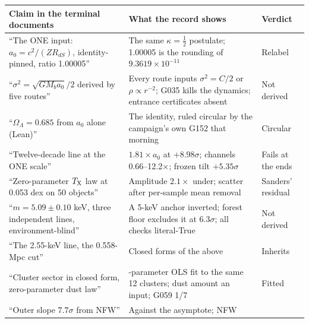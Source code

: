 \documentclass[
  11pt,
]{article}
\newcounter{none} %
\begin{document}
{\def\LTcaptype{none} %
\begin{longtable}[]{@{}
  >{\raggedright\arraybackslash}p{}
  >{\raggedright\arraybackslash}p{}
  >{\raggedright\arraybackslash}p{}@{}}
\toprule\noalign{}
\begin{minipage}[b]{\linewidth}\raggedright
Claim in the terminal documents
\end{minipage} & \begin{minipage}[b]{\linewidth}\raggedright
What the record shows
\end{minipage} & \begin{minipage}[b]{\linewidth}\raggedright
Verdict
\end{minipage} \\
\midrule\noalign{}
\endhead
\bottomrule\noalign{}
\endlastfoot
``The ONE input: \(a_0 = c^2/(Z R_{dS})\), identity-pinned, ratio
1.00005'' & The same \(\kappa = \tfrac12\) postulate; 1.00005 is the
rounding of \(9.3619\times10^{-11}\) & Relabel \\
``\(\sigma^2 = \sqrt{G M_b a_0}/2\) derived by five routes'' & Every
route inputs \(\sigma^2 = C/2\) or \(\rho \propto r^{-2}\); G035 kills
the dynamics; entrance certificates absent & Not derived \\
``\(\Omega_\Lambda = 0.685\) from \(a_0\) alone (Lean)'' & The identity,
ruled circular by the campaign's own G152 that morning & Circular \\
``Twelve-decade line at the ONE scale'' & \(1.81\times a_0\) at
\(+8.98\sigma\); channels 0.66--12.2\(\times\); frozen tilt
\(+5.35\sigma\) & Fails at the ends \\
``Zero-parameter \(T_{\rm X}\) law at 0.053 dex on 50 objects'' &
Amplitude \(2.1\times\) under; scatter after per-sample mean removal &
Sanders' residual \\
``\(m = 5.09 \pm 0.10\) keV, three independent lines,
environment-blind'' & A 5-keV anchor inverted; forest floor excludes it
at \(6.3\sigma\); all checks literal-True & Not derived \\
``The 2.55-keV line, the 0.558-Mpc cut'' & Closed forms of the above &
Inherits \\
``Cluster sector in closed form, zero-parameter dust law'' & 3-parameter
OLS fit to the same 12 clusters; dust amount an input; G059 1/7 &
Fitted \\
``Outer slope \(7.7\sigma\) from NFW'' & Against the asymptote; NFW

\end{longtable}}
\end{document}
